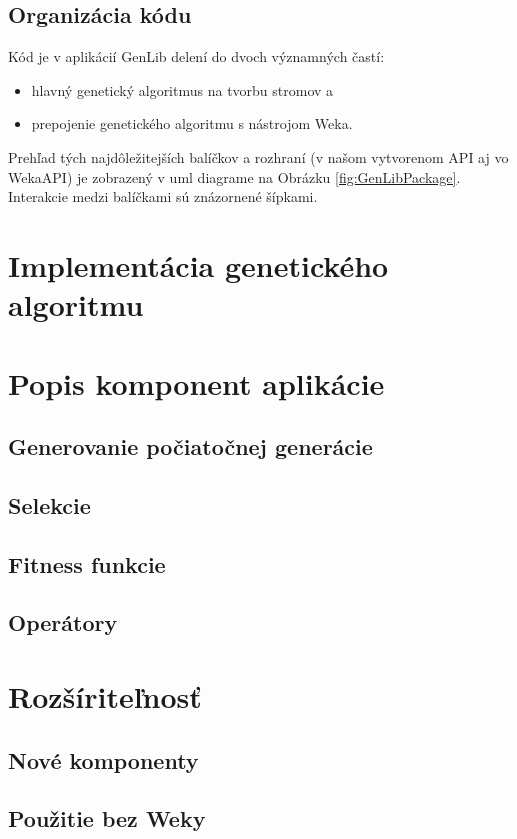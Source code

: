 \pagebreak

\subsection{Organizácia kódu}\label{kap4:4.2:4.2.2:CodeOrganization}
Kód je v aplikácií GenLib delení do dvoch významných častí:
\begin{itemize}
\item hlavný genetický algoritmus na tvorbu stromov a
\item prepojenie genetického algoritmu s nástrojom Weka.
\end{itemize}



Prehľad tých najdôležitejších balíčkov a rozhraní (v našom vytvorenom API aj vo WekaAPI) je zobrazený v uml diagrame na Obrázku \ref{fig:GenLibPackage}. Interakcie medzi balíčkami sú znázornené šípkami.
\section{Implementácia genetického algoritmu}\label{kap4:4.3:Implementation}
\section{Popis komponent aplikácie}\label{kap4:4.4:Components}
\subsection{Generovanie počiatočnej generácie}
\subsection{Selekcie}
\subsection{Fitness funkcie}
\subsection{Operátory}
\section{Rozšíriteľnosť}\label{kap4:4.5:Plugin}
\subsection{Nové komponenty}
\subsection{Použitie bez Weky}